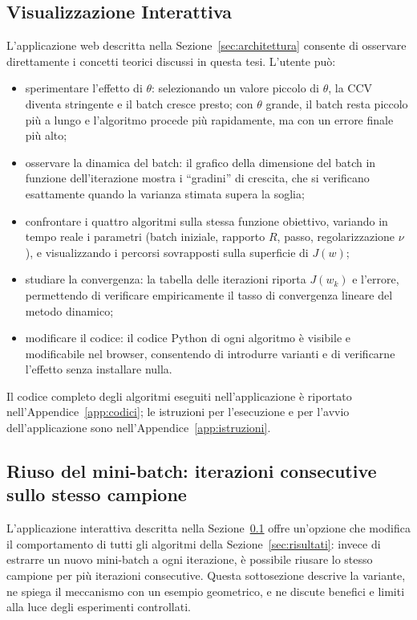 \documentclass[a4paper,12pt]{article}
\numberwithin{equation}{section}
\numberwithin{figure}{section}
\numberwithin{table}{section}
\begin{document}
\subsection{Visualizzazione Interattiva}\label{sec:visualizzazione}

L'applicazione web descritta nella Sezione~\ref{sec:architettura} consente
di osservare direttamente i concetti teorici discussi in questa tesi.
L'utente può:

\begin{itemize}
  \item sperimentare l'effetto di $\theta$: selezionando un valore
  piccolo di $\theta$, la CCV diventa stringente e il batch cresce presto; con
  $\theta$ grande, il batch resta piccolo più a lungo e l'algoritmo procede
  più rapidamente, ma con un errore finale più alto;
  \item osservare la dinamica del batch: il grafico della dimensione
  del batch in funzione dell'iterazione mostra i ``gradini'' di crescita,
  che si verificano esattamente quando la varianza stimata supera la soglia;
  \item confrontare i quattro algoritmi sulla stessa funzione obiettivo,
  variando in tempo reale i parametri (batch iniziale, rapporto $R$, passo,
  regolarizzazione $\nu$), e visualizzando i percorsi sovrapposti sulla
  superficie di $J(w)$;
  \item studiare la convergenza: la tabella delle iterazioni riporta
  $J(w_k)$ e l'errore, permettendo di verificare empiricamente il tasso di
  convergenza lineare del metodo dinamico;
  \item modificare il codice: il codice Python di ogni algoritmo è
  visibile e modificabile nel browser, consentendo di introdurre varianti e di
  verificarne l'effetto senza installare nulla.
\end{itemize}

Il codice completo degli algoritmi eseguiti nell'applicazione è riportato
nell'Appendice~\ref{app:codici}; le istruzioni per l'esecuzione e per
l'avvio dell'applicazione sono nell'Appendice~\ref{app:istruzioni}.

\subsection{Riuso del mini-batch: iterazioni consecutive sullo stesso campione}\label{app:riuso}

L'applicazione interattiva descritta nella Sezione~\ref{sec:visualizzazione} offre
un'opzione che modifica il comportamento di tutti gli algoritmi della
Sezione~\ref{sec:risultati}: invece di estrarre un nuovo mini-batch a ogni
iterazione, è possibile riusare lo stesso campione per più iterazioni
consecutive. Questa sottosezione descrive la variante, ne spiega il meccanismo
con un esempio geometrico, e ne discute benefici e limiti alla luce degli
esperimenti controllati.
\end{document}
